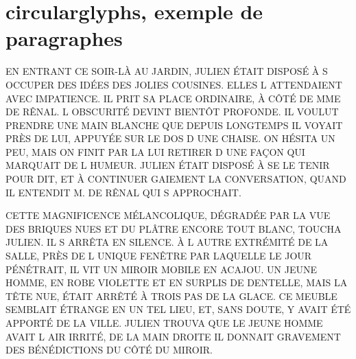 \documentclass[french,11pt,a4paper]{article}
\begin{document}
\part*{circularglyphs, exemple de paragraphes}

\medskip

EN ENTRANT CE SOIR-LÀ AU JARDIN, JULIEN ÉTAIT DISPOSÉ À S OCCUPER DES IDÉES DES JOLIES COUSINES. ELLES L ATTENDAIENT AVEC IMPATIENCE. IL PRIT SA PLACE ORDINAIRE, À CÔTÉ DE MME DE RÊNAL. L OBSCURITÉ DEVINT BIENTÔT PROFONDE. IL VOULUT PRENDRE UNE MAIN BLANCHE QUE DEPUIS LONGTEMPS IL VOYAIT PRÈS DE LUI, APPUYÉE SUR LE DOS D UNE CHAISE. ON HÉSITA UN PEU, MAIS ON FINIT PAR LA LUI RETIRER D UNE FAÇON QUI MARQUAIT DE L HUMEUR. JULIEN ÉTAIT DISPOSÉ À SE LE TENIR POUR DIT, ET À CONTINUER GAIEMENT LA CONVERSATION, QUAND IL ENTENDIT M. DE RÊNAL QUI S APPROCHAIT.\par

\medskip

\noindent{}

\medskip

CETTE MAGNIFICENCE MÉLANCOLIQUE, DÉGRADÉE PAR LA VUE DES BRIQUES NUES ET DU PLÂTRE ENCORE TOUT BLANC, TOUCHA JULIEN. IL S ARRÊTA EN SILENCE. À L AUTRE EXTRÉMITÉ DE LA SALLE, PRÈS DE L UNIQUE FENÊTRE PAR LAQUELLE LE JOUR PÉNÉTRAIT, IL VIT UN MIROIR MOBILE EN ACAJOU. UN JEUNE HOMME, EN ROBE VIOLETTE ET EN SURPLIS DE DENTELLE, MAIS LA TÊTE NUE, ÉTAIT ARRÊTÉ À TROIS PAS DE LA GLACE. CE MEUBLE SEMBLAIT ÉTRANGE EN UN TEL LIEU, ET, SANS DOUTE, Y AVAIT ÉTÉ APPORTÉ DE LA VILLE. JULIEN TROUVA QUE LE JEUNE HOMME AVAIT L AIR IRRITÉ, DE LA MAIN DROITE IL DONNAIT GRAVEMENT DES BÉNÉDICTIONS DU CÔTÉ DU MIROIR.\par

\medskip

\noindent{}
\end{document}
